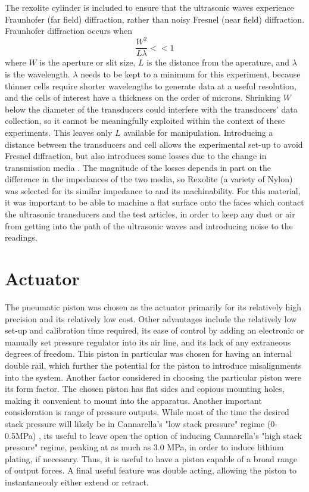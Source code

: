 The rexolite cylinder is included to ensure that the ultrasonic waves experience Fraunhofer (far field) diffraction, rather than noisy Fresnel (near field) diffraction. 
Fraunhofer diffraction occurs when
$$ \frac{W^2}{L\lambda} << 1$$
where $W$ is the aperture or slit size, $L$ is the distance from the aperature, and $\lambda$ is the wavelength.
$\lambda$ needs to be kept to a minimum for this experiment, because thinner cells require shorter wavelengths to generate data at a useful resolution, and the cells of interest have a thickness on the order of microns. Shrinking $W$ below the diameter of the transducers could interfere with the transducers' data collection, so it cannot be meaningfully exploited within the context of these experiments. This leaves only $L$ available for manipulation. Introducing a distance between the transducers and cell allows the experimental set-up to avoid Fresnel diffraction, but also introduces some losses due to the change in transmission media . The magnitude of the losses depends in part on the difference in the impedances of the two media, so Rexolite (a variety of Nylon) was selected for its similar impedance to  and its machinability. For this material, it was important to be able to machine a flat surface onto the faces which contact the ultrasonic transducers and the test articles, in order to keep any dust or air from getting into the path of the ultrasonic waves and introducing noise to the readings.
 
\section{Actuator}
The pneumatic piston was chosen as the actuator primarily for its relatively high precision and its relatively low cost. Other advantages include the relatively low set-up and calibration time required, its ease of control by adding an electronic or manually set pressure regulator into its air line, and its lack of any extraneous degrees of freedom. This piston in particular was chosen for having an internal double rail, which further the potential for the piston to introduce misalignments into the system. Another factor considered in choosing the particular piston were its form factor. The chosen piston has flat sides and copious mounting holes, making it convenient to mount into the apparatus. Another important consideration is range of pressure outputs. While most of the time the desired stack pressure will likely be in Cannarella's "low stack pressure" regime (0-0.5MPa) , its useful to leave open the option of inducing Cannarella's "high stack pressure" regime, peaking at as much as 3.0 MPa, in order to induce lithium plating, if necessary.  Thus, it is useful to have a piston capable of a broad range of output forces. A final useful feature was double acting, allowing the piston to instantaneouly either extend or retract.
    